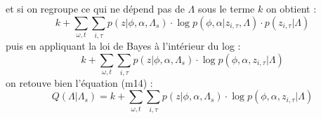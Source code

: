 \documentclass[a4paper,12pt]{article}
\begin{document}
et si on regroupe ce qui ne dépend pas de $\Lambda$ sous le terme $k$ on obtient :
\begin{equation*}
k + \displaystyle\sum_{\omega,t} \displaystyle\sum_{i, \tau} p(z|\phi,\alpha,\Lambda_s) \cdot \log p(\phi, \alpha | z_{i, \tau}, \Lambda) \cdot p(z_{i, \tau} | \Lambda)
\end{equation*}
puis en appliquant la loi de Bayes à l'intérieur du log :
\begin{equation*}
k + \displaystyle\sum_{\omega,t} \displaystyle\sum_{i, \tau} p(z|\phi,\alpha,\Lambda_s) \cdot \log p(\phi, \alpha, z_{i, \tau} | \Lambda)
\end{equation*}
on retouve bien l'équation (m14) :
\begin{equation}
Q(\Lambda|\Lambda_s) = k + \displaystyle\sum_{\omega,t} \displaystyle\sum_{i, \tau} p(z|\phi,\alpha,\Lambda_s) \cdot \log p(\phi, \alpha, z_{i, \tau} | \Lambda) \label{Q}
\end{equation}
\end{document}
